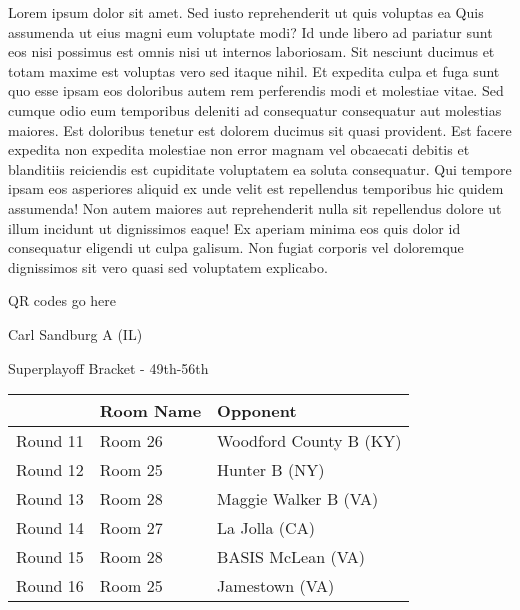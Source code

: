 \documentclass{article}%
\begin{document}
\vspace*{8pt}%
\linebreak%
\newline%
\newline%
    Lorem ipsum dolor sit amet. Sed iusto reprehenderit ut quis voluptas ea Quis assumenda ut eius magni eum voluptate modi? Id unde libero ad pariatur sunt eos nisi possimus est omnis nisi ut internos laboriosam. Sit nesciunt ducimus et totam maxime est voluptas vero sed itaque nihil. Et expedita culpa et fuga sunt quo esse ipsam eos doloribus autem rem perferendis modi et molestiae vitae.\newline%
\newline%
    Sed cumque odio eum temporibus deleniti ad consequatur consequatur aut molestias maiores. Est doloribus tenetur est dolorem ducimus sit quasi provident. Est facere expedita non expedita molestiae non error magnam vel obcaecati debitis et blanditiis reiciendis est cupiditate voluptatem ea soluta consequatur. Qui tempore ipsam eos asperiores aliquid ex unde velit est repellendus temporibus hic quidem assumenda!\newline%
\newline%
    Non autem maiores aut reprehenderit nulla sit repellendus dolore ut illum incidunt ut dignissimos eaque! Ex aperiam minima eos quis dolor id consequatur eligendi ut culpa galisum. Non fugiat corporis vel doloremque dignissimos sit vero quasi sed voluptatem explicabo.\newline%
\newline%
\vspace*{30pt}%
\begin{center}%
\begin{Huge}%
QR codes go here%
\end{Huge}%
\end{center}%
\newpage%
\begin{center}%
\begin{Huge}%
Carl Sandburg A (IL)%
\end{Huge}%
\vspace*{8pt}%
\linebreak%
\begin{Large}%
Superplayoff Bracket {-} 49th{-}56th%
\end{Large}%
\end{center}%
%
\begin{tabularx}{\textwidth}{|c|Y|Y|}%
\hline%
&Room Name&Opponent\\%
\hline%
Round 11&Room 26&Woodford County B (KY)\\%
Round 12&Room 25&Hunter B (NY)\\%
Round 13&Room 28&Maggie Walker B (VA)\\%
Round 14&Room 27&La Jolla (CA)\\%
Round 15&Room 28&BASIS McLean (VA)\\%
Round 16&Room 25&Jamestown (VA)\\%
\hline%
\end{tabularx}%
\end{document}
